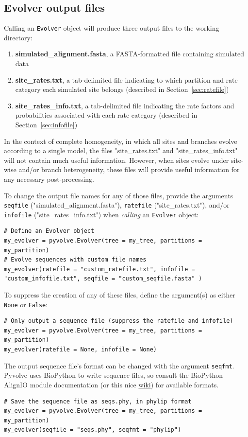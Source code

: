 \documentclass{article}
\newcommand{\code}[1]{\texttt{\small{#1}}}
\begin{document}
\subsection{Evolver output files}\label{sec:output_files}

Calling an \code{Evolver} object will produce three output files to the working directory:
\begin{enumerate}
	\item \textbf{simulated\_alignment.fasta}, a FASTA-formatted file containing simulated data
	\item \textbf{site\_rates.txt}, a tab-delimited file indicating to which partition and rate category each simulated site belongs (described in Section~\ref{sec:ratefile})
	\item \textbf{site\_rates\_info.txt}, a tab-delimited file indicating the rate factors and probabilities associated with each rate category (described in Section~\ref{sec:infofile})
\end{enumerate}


In the context of complete homogeneity, in which all sites and branches evolve according to a single model, the files "site\_rates.txt" and "site\_rates\_info.txt" will not contain much useful information. However, when sites evolve under site-wise and/or branch heterogeneity, these files will provide useful information for any necessary post-processing.

To change the output file names for any of those files, provide the arguments \code{seqfile} ("simulated\_alignment.fasta"), \code{ratefile} ("site\_rates.txt"), and/or \code{infofile} ("site\_rates\_info.txt") when \emph{calling} an \code{Evolver} object:
\begin{lstlisting}
# Define an Evolver object
my_evolver = pyvolve.Evolver(tree = my_tree, partitions = my_partition)
# Evolve sequences with custom file names
my_evolver(ratefile = "custom_ratefile.txt", infofile = "custom_infofile.txt", seqfile = "custom_seqfile.fasta" )
\end{lstlisting}

To suppress the creation of any of these files, define the argument(s) as either \code{None} or \code{False}:
\begin{lstlisting}
# Only output a sequence file (suppress the ratefile and infofile)
my_evolver = pyvolve.Evolver(tree = my_tree, partitions = my_partition)
my_evolver(ratefile = None, infofile = None)
\end{lstlisting}

The output sequence file's format can be changed with the argument \code{seqfmt}. Pyvolve uses BioPython to write sequence files, so consult the BioPython AlignIO module documentation (or this nice \href{http://biopython.org/wiki/AlignIO}{wiki}) for available formats.
\begin{lstlisting}
# Save the sequence file as seqs.phy, in phylip format 
my_evolver = pyvolve.Evolver(tree = my_tree, partitions = my_partition)
my_evolver(seqfile = "seqs.phy", seqfmt = "phylip")
\end{lstlisting}
\end{document}

